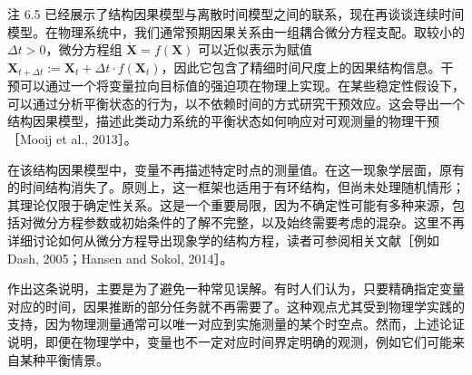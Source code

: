 \begin{remark}[与常微分方程的关系]
注 6.5 已经展示了结构因果模型与离散时间模型之间的联系，现在再谈谈连续时间模型。在物理系统中，我们通常预期因果关系由一组耦合微分方程支配。取较小的 $\Delta t>0$，微分方程组 $\dot{\mathbf X}=f(\mathbf X)$ 可以近似表示为赋值 $\mathbf X_{t+\Delta t}:=\mathbf X_t+\Delta t\cdot f(\mathbf X_t)$，因此它包含了精细时间尺度上的因果结构信息。干预可以通过一个将变量拉向目标值的强迫项在物理上实现。在某些稳定性假设下，可以通过分析平衡状态的行为，以不依赖时间的方式研究干预效应。这会导出一个结构因果模型，描述此类动力系统的平衡状态如何响应对可观测量的物理干预［Mooij et al., 2013］。

在该结构因果模型中，变量不再描述特定时点的测量值。在这一现象学层面，原有的时间结构消失了。原则上，这一框架也适用于有环结构，但尚未处理随机情形；其理论仅限于确定性关系。这是一个重要局限，因为不确定性可能有多种来源，包括对微分方程参数或初始条件的了解不完整，以及始终需要考虑的混杂。这里不再详细讨论如何从微分方程导出现象学的结构方程，读者可参阅相关文献［例如 Dash, 2005；Hansen and Sokol, 2014］。

作出这条说明，主要是为了避免一种常见误解。有时人们认为，只要精确指定变量对应的时间，因果推断的部分任务就不再需要了。这种观点尤其受到物理学实践的支持，因为物理测量通常可以唯一对应到实施测量的某个时空点。然而，上述论证说明，即便在物理学中，变量也不一定对应时间界定明确的观测，例如它们可能来自某种平衡情景。
\end{remark}
\FloatBarrier
